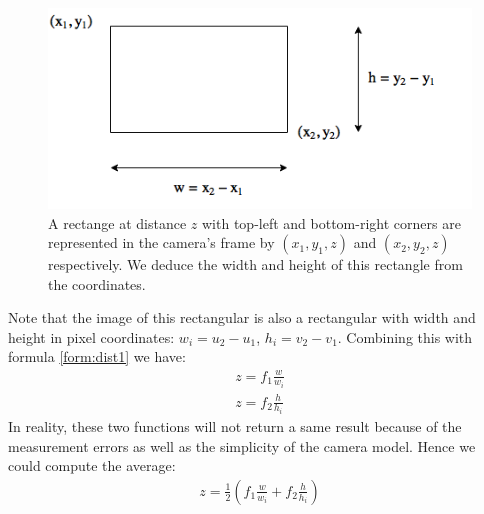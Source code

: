 \begin{figure}[tb]
	\centering
	\includegraphics[width=0.6\hsize]{./figures/rectForm}
	\caption{A rectange at distance $z$ with top-left and bottom-right corners are represented in the camera's frame by $(x_1, y_1, z)$ and $(x_2, y_2, z)$ respectively. We deduce the width and height of this rectangle from the coordinates.}
	\label{fig:rectForm}
\end{figure}

Note that the image of this rectangular is also a rectangular with width and height in pixel coordinates: $w_{i} = u_2 - u_1$, $h_{i} = v_2 - v_1$. Combining this with formula \ref{form:dist1} we have:
\begin{align}
\label{form:dist2}
z = f_1  \frac{w}{w_i} \nonumber \\
z = f_2  \frac{h}{h_i}
\end{align}
In reality, these two functions will not return a same result because of the measurement errors as well as the simplicity of the camera model. Hence we could compute the average:
\begin{align}
z = \frac{1}{2} (f_1 \frac{w}{w_i} + f_2 \frac{h}{h_i})
\label{form:distEst}
\end{align}

